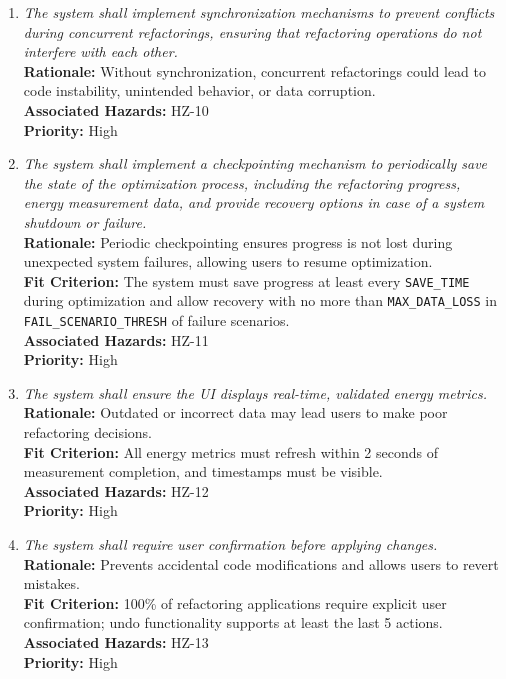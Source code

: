 \documentclass{article}
\begin{document}
\begin{enumerate}[label=SCR \arabic*., wide=0pt, leftmargin=*]
    \item \emph{The system shall implement synchronization mechanisms to prevent conflicts during concurrent refactorings, ensuring that refactoring operations do not interfere with each other.}\\
    {\bf Rationale:} Without synchronization, concurrent refactorings could lead to code instability, unintended behavior, or data corruption.\\
    {\bf Associated Hazards:} HZ-10\\
    {\bf Priority:} High

    \item \emph{The system shall implement a checkpointing mechanism to periodically save the state of the optimization process, including the refactoring progress, energy measurement data, and provide recovery options in case of a system shutdown or failure.}\\
    {\bf Rationale:} Periodic checkpointing ensures progress is not lost during unexpected system failures, allowing users to resume optimization.\\
    {\bf Fit Criterion:} The system must save progress at least every \texttt{SAVE\_TIME} during optimization and allow recovery with no more than \texttt{MAX\_DATA\_LOSS} in \texttt{FAIL\_SCENARIO\_THRESH} of failure scenarios.\\
    {\bf Associated Hazards:} HZ-11\\
    {\bf Priority:} High

    \item \emph{The system shall ensure the UI displays real-time, validated energy metrics.}\\
    {\bf Rationale:} Outdated or incorrect data may lead users to make poor refactoring decisions.\\
    {\bf Fit Criterion:} All energy metrics must refresh within 2 seconds of measurement completion, and timestamps must be visible.\\
    {\bf Associated Hazards:} HZ-12\\
    {\bf Priority:} High

    \item \emph{The system shall require user confirmation before applying changes.}\\
    {\bf Rationale:} Prevents accidental code modifications and allows users to revert mistakes.\\
    {\bf Fit Criterion:} 100\% of refactoring applications require explicit user confirmation; undo functionality supports at least the last 5 actions.\\
    {\bf Associated Hazards:} HZ-13\\
    {\bf Priority:} High


\end{enumerate}
\end{document}
